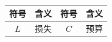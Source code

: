 \documentclass[12pt]{ctexart}
\begin{document}
\begin{tabular}{clcl}
\toprule
符号 & 含义 & 符号 & 含义 \\
\midrule
$L$ & 损失 & $C$ & 预算 \\
\bottomrule
\end{tabular}
\end{document}
